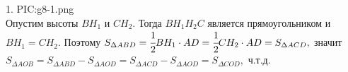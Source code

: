 1. {{PIC:g8-1.png}}\\
Опустим высоты $BH_1$ и $CH_2.$ Тогда $BH_1H_2C$ является прямоугольником и $BH_1=CH_2.$ Поэтому $S_{\Delta ABD}=\cfrac{1}{2}BH_1\cdot AD=\cfrac{1}{2}CH_2\cdot AD=S_{\Delta ACD},$ значит $S_{\Delta AOB}=S_{\Delta ABD}-S_{\Delta AOD}=S_{\Delta ACD}-S_{\Delta AOD}=S_{\Delta COD},$ ч.т.д.\\
